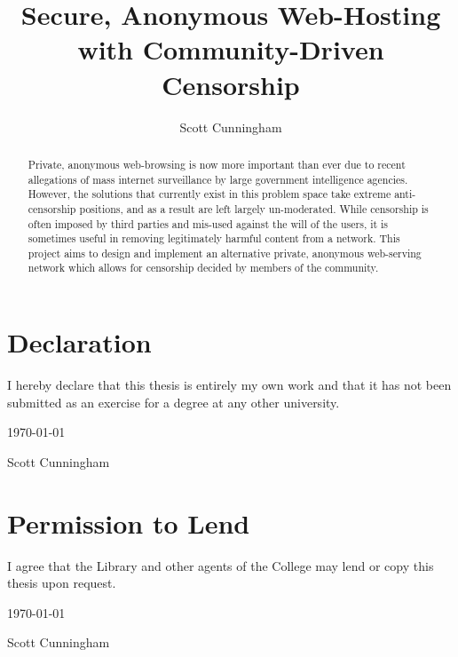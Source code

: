
\title{Secure, Anonymous Web-Hosting with Community-Driven Censorship}
\author{Scott Cunningham}

\maketitle

\chapter*{Declaration}

I hereby declare that this thesis is entirely my own work and that it
has not been submitted as an exercise for a degree at any other
university.

\begin{center}
    \vspace*{2in}

    \underline{\hspace*{3in}} \today

    Scott Cunningham

\end{center}

\chapter*{Permission to Lend}

I agree that the Library and other agents of
the College may lend or copy this thesis upon request.

\begin{center}
    \vspace*{2in}

    \underline{\hspace*{3in}} \today

    Scott Cunningham


\end{center}


\begin{abstract}

Private, anonymous web-browsing is now more important than ever due to recent
allegations of mass internet surveillance by large government intelligence
agencies.
However, the solutions that currently exist in this problem space take extreme
anti-censorship positions,
and as a result are left largely un-moderated. While censorship is often
imposed by third parties and mis-used against the will of the users,
it is sometimes useful in removing legitimately harmful content from a network.
This project aims to design and implement an alternative private, anonymous
web-serving network which allows for censorship decided by members of the community.

\end{abstract}

